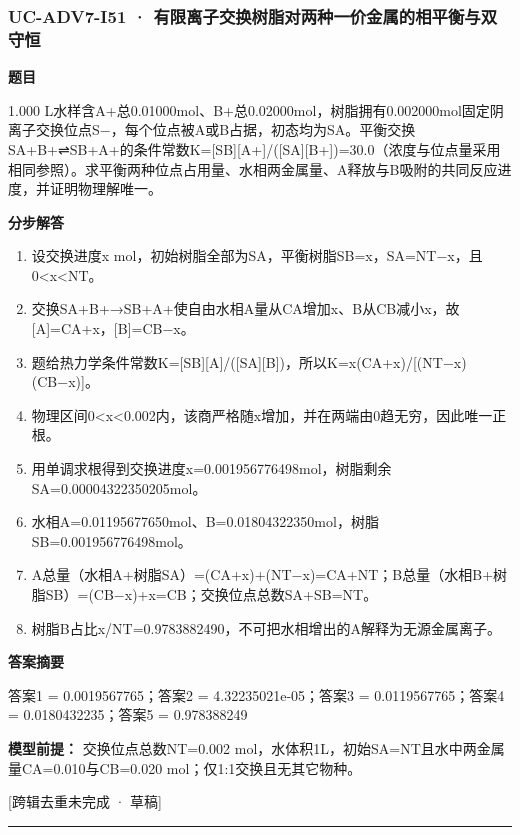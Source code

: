 \documentclass[UTF8,11pt,a4paper]{ctexart}
\begin{document}
\subsubsection*{UC-ADV7-I51 · 有限离子交换树脂对两种一价金属的相平衡与双守恒}
\noindent\textbf{题目}\par
1.000 L水样含A+总0.01000mol、B+总0.02000mol，树脂拥有0.002000mol固定阴离子交换位点S−，每个位点被A或B占据，初态均为SA。平衡交换SA+B+⇌SB+A+的条件常数K=[SB][A+]/([SA][B+])=30.0（浓度与位点量采用相同参照）。求平衡两种位点占用量、水相两金属量、A释放与B吸附的共同反应进度，并证明物理解唯一。\par
\medskip\noindent\textbf{分步解答}
\begin{enumerate}
\item 设交换进度x mol，初始树脂全部为SA，平衡树脂SB=x，SA=NT−x，且0<x<NT。
\item 交换SA+B+→SB+A+使自由水相A量从CA增加x、B从CB减小x，故[A]=CA+x，[B]=CB−x。
\item 题给热力学条件常数K=[SB][A]/([SA][B])，所以K=x(CA+x)/[(NT−x)(CB−x)]。
\item 物理区间0<x<0.002内，该商严格随x增加，并在两端由0趋无穷，因此唯一正根。
\item 用单调求根得到交换进度x=0.001956776498mol，树脂剩余SA=0.00004322350205mol。
\item 水相A=0.01195677650mol、B=0.01804322350mol，树脂SB=0.001956776498mol。
\item A总量（水相A+树脂SA）=(CA+x)+(NT−x)=CA+NT；B总量（水相B+树脂SB）=(CB−x)+x=CB；交换位点总数SA+SB=NT。
\item 树脂B占比x/NT=0.9783882490，不可把水相增出的A解释为无源金属离子。
\end{enumerate}
\noindent\textbf{答案摘要}\par
答案1 = 0.0019567765；答案2 = 4.32235021e-05；答案3 = 0.0119567765；答案4 = 0.0180432235；答案5 = 0.978388249\par
\noindent\textbf{模型前提：}
交换位点总数NT=0.002 mol，水体积1L，初始SA=NT且水中两金属量CA=0.010与CB=0.020 mol；仅1:1交换且无其它物种。\par
\noindent\textcolor{red!65!black}{[跨辑去重未完成 · 草稿]} \par
\medskip\hrule\medskip
{}
\end{document}
